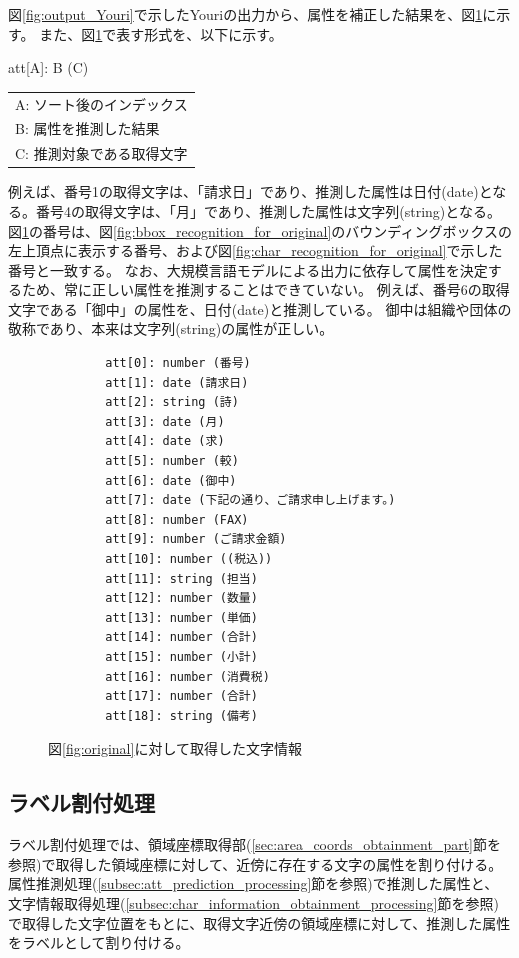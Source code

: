 図\ref{fig:output_Youri}で示したYouriの出力から、属性を補正した結果を、図\ref{fig:predict_att_for_original}に示す。
また、図\ref{fig:predict_att_for_original}で表す形式を、以下に示す。

\begin{center}
    att[A]: B (C)
\end{center}

\begin{center}
    \begin{tabular}{l}
        A: ソート後のインデックス\\
        B: 属性を推測した結果\\
        C: 推測対象である取得文字\\
    \end{tabular}
\end{center}

例えば、番号1の取得文字は、「請求日」であり、推測した属性は日付(date)となる。番号4の取得文字は、「月」であり、推測した属性は文字列(string)となる。
図\ref{fig:predict_att_for_original}の番号は、図\ref{fig:bbox_recognition_for_original}のバウンディングボックスの左上頂点に表示する番号、および図\ref{fig:char_recognition_for_original}で示した番号と一致する。
なお、大規模言語モデルによる出力に依存して属性を決定するため、常に正しい属性を推測することはできていない。
例えば、番号6の取得文字である「御中」の属性を、日付(date)と推測している。
御中は組織や団体の敬称であり、本来は文字列(string)の属性が正しい。

\lstset{language=}
\begin{figure}[t]
    \begin{lstlisting}
        att[0]: number (番号)
        att[1]: date (請求日)
        att[2]: string (詩)
        att[3]: date (月)
        att[4]: date (求)
        att[5]: number (較)
        att[6]: date (御中)
        att[7]: date (下記の通り、ご請求申し上げます。)
        att[8]: number (FAX)
        att[9]: number (ご請求金額)
        att[10]: number ((税込))
        att[11]: string (担当)
        att[12]: number (数量)
        att[13]: number (単価)
        att[14]: number (合計)
        att[15]: number (小計)
        att[16]: number (消費税)
        att[17]: number (合計)
        att[18]: string (備考)
    \end{lstlisting}
    \caption{図\ref{fig:original}に対して取得した文字情報}
    \label{fig:predict_att_for_original}
\end{figure}

\subsection{ラベル割付処理}\label{subsec:label_link_processing}
ラベル割付処理では、領域座標取得部(\ref{sec:area_coords_obtainment_part}節を参照)で取得した領域座標に対して、近傍に存在する文字の属性を割り付ける。
属性推測処理(\ref{subsec:att_prediction_processing}節を参照)で推測した属性と、文字情報取得処理(\ref{subsec:char_information_obtainment_processing}節を参照)で取得した文字位置をもとに、取得文字近傍の領域座標に対して、推測した属性をラベルとして割り付ける。

